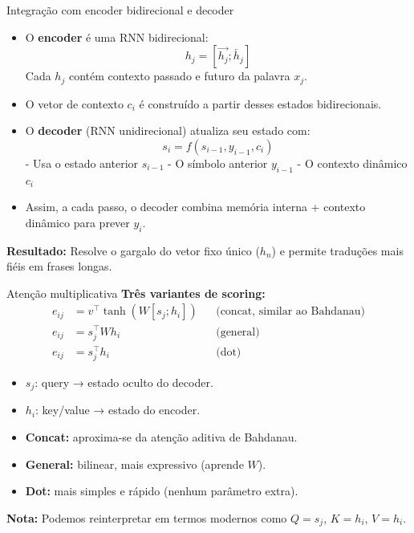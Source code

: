 \documentclass{beamer}
\begin{document}
\begin{frame}{Integração com encoder bidirecional e decoder}
\begin{itemize}
  \item O \textbf{encoder} é uma RNN bidirecional:
  \[
  h_j = [\overrightarrow{h_j}; \overleftarrow{h_j}]
  \]
  Cada $h_j$ contém contexto passado e futuro da palavra $x_j$.
  
  \item O vetor de contexto $c_i$ é construído a partir desses estados bidirecionais.
  
  \item O \textbf{decoder} (RNN unidirecional) atualiza seu estado com:
  \[
  s_i = f(s_{i-1}, y_{i-1}, c_i)
  \]
  - Usa o estado anterior $s_{i-1}$
  - O símbolo anterior $y_{i-1}$
  - O contexto dinâmico $c_i$
  
  \item Assim, a cada passo, o decoder combina memória interna + contexto dinâmico para prever $y_i$.
\end{itemize}

\textbf{Resultado:} 
Resolve o gargalo do vetor fixo único ($h_n$) e permite traduções mais fiéis em frases longas.
\end{frame}


\begin{frame}{Atenção multiplicativa \cite{luong2015effective}}
\textbf{Três variantes de scoring:}
\[
\begin{aligned}
e_{ij} &= v^\top \tanh(W [s_j; h_i]) && \text{(concat, similar ao Bahdanau)} \\
e_{ij} &= s_j^\top W h_i && \text{(general)} \\
e_{ij} &= s_j^\top h_i && \text{(dot)}
\end{aligned}
\]

\begin{itemize}
  \item $s_j$: query → estado oculto do decoder.
  \item $h_i$: key/value → estado do encoder.
  \item \textbf{Concat:} aproxima-se da atenção aditiva de Bahdanau.
  \item \textbf{General:} bilinear, mais expressivo (aprende $W$).
  \item \textbf{Dot:} mais simples e rápido (nenhum parâmetro extra).
\end{itemize}

\textbf{Nota:} Podemos reinterpretar em termos modernos como $Q=s_j$, $K=h_i$, $V=h_i$.
\end{frame}
\end{document}
